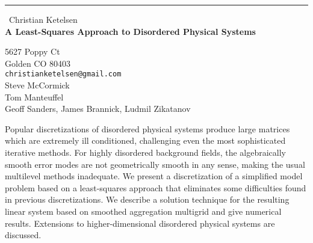 \documentclass{report}
\begin{document}
\begin{center}
\rule{6in}{1pt} \
{\large Christian Ketelsen \\
{\bf A Least-Squares Approach to Disordered Physical Systems}}

5627 Poppy Ct \\ Golden CO 80403
\\
{\tt christianketelsen@gmail.com}\\
Steve McCormick\\
Tom Manteuffel\\
	Geoff Sanders, James Brannick, Ludmil Zikatanov\end{center}

Popular discretizations of disordered physical systems produce large
matrices which are extremely ill conditioned, challenging even the most
sophisticated iterative methods. For highly disordered background fields,
the algebraically smooth error modes are not geometrically smooth in any
sense, making the usual multilevel methods inadequate. We present a
discretization of a simplified model problem based on a least-squares
approach that eliminates some difficulties found in previous
discretizations. We describe a solution technique for the resulting
linear system based on smoothed aggregation multigrid and give numerical
results. Extensions to higher-dimensional disordered physical systems are
discussed.
\end{document}
